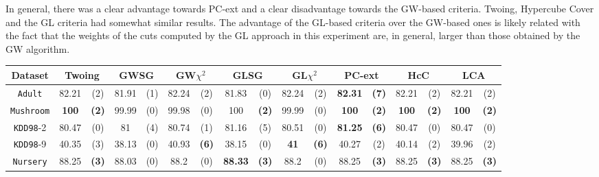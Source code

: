 In general, there was a clear advantage towards PC-ext and a clear disadvantage towards the GW-based criteria. Twoing, Hypercube Cover and the GL criteria had somewhat similar results. The advantage of the GL-based criteria over the GW-based ones is likely related with the fact that the weights of the cuts computed by the GL approach in this experiment are, in general, larger than those obtained by the GW algorithm.


\begin{sidewaystable*}[ph!]
\centering
\begin{tabular}{c|cc|cc|cc|cc|cc|cc|cc|cc} 
Dataset & \multicolumn{2}{c|}{Twoing} &  \multicolumn{2}{c|}{GWSG}  
&   \multicolumn{2}{c|}{GW$\chi^2$}                   &\multicolumn{2}{c|}{GLSG}       &\multicolumn{2}{c|}{GL$\chi^2$} & \multicolumn{2}{c|}{PC-ext} & \multicolumn{2}{c|}{HcC}& \multicolumn{2}{c}{LCA}\\
\hline 
{\tt Adult}         & 82.21    & (2)    & 81.91    & (1)    & 82.24    & (2)    & 81.83    & (0)    & 82.24    & (2)    &{\bf82.31}&{\bf(7)}          & 82.21    & (2)      & 82.21    & (2)      \\
{\tt Mushroom}      & {\bf 100}&{\bf(2)}& 99.99    & (0)    & 99.98    & (0)    & 100      &{\bf(2)}& 99.99    & (0)    &{\bf 100} &{\bf(2)}          &{\bf100}  & {\bf(2)} & {\bf100} & {\bf(2)} \\
{\tt KDD98}-2       & 80.47    & (0)    & 81       & (4)    & 80.74    & (1)    & 81.16    & (5)    & 80.51    & (0)    &{\bf81.25}&{\bf(6)}          & 80.47    & (0)      & 80.47    & (0)      \\
{\tt KDD98}-9       & 40.35    & (3)    & 38.13    & (0)    & 40.93    &{\bf(6)}& 38.15    & (0)    &{\bf 41 } &{\bf(6)}& 40.27    & (2)              & 40.14    & (2)      & 39.96    & (2)      \\
{\tt Nursery}       & 88.25    &{\bf(3)}& 88.03    & (0)    & 88.2     & (0)    &{\bf88.33}&{\bf(3)}& 88.2     & (0)    & 88.25    &{\bf(3)}          & 88.25    & {\bf(3)} & 88.25    & {\bf(3)} \\

\end{tabular}
\end{sidewaystable*}
